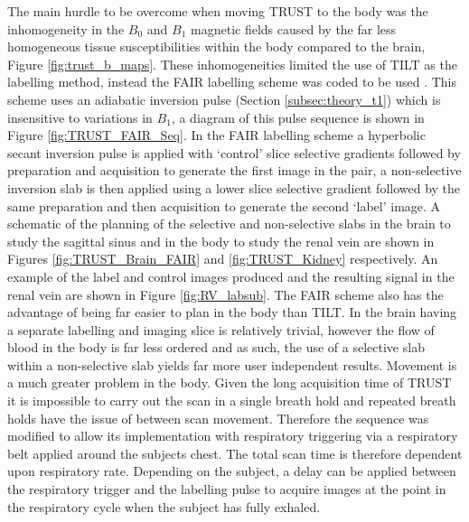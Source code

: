 The main hurdle to be overcome when moving \ac{TRUST} to the body was the inhomogeneity in the $B_0$ and $B_1$ magnetic fields caused by the far less homogeneous tissue susceptibilities within the body compared to the brain, Figure \ref{fig:trust_b_maps}. These inhomogeneities limited the use of \ac{TILT} as the labelling method, instead the \ac{FAIR} labelling scheme was coded to be used \cite{martirosian_fair_2004}. This scheme uses an adiabatic inversion pulse (Section \ref{subsec:theory_t1}) which is insensitive to variations in $B_1$, a diagram of this pulse sequence is shown in Figure \ref{fig:TRUST_FAIR_Seq}. In the \ac{FAIR} labelling scheme a hyperbolic secant inversion pulse is applied with `control' slice selective gradients  followed by \ttwo preparation and acquisition to generate the first image in the pair, a non-selective inversion slab is then applied using a lower slice selective gradient followed by the same \ttwo preparation and then acquisition to generate the second `label' image. A schematic of the planning of the selective and non-selective slabs in the brain to study the sagittal sinus and in the body to study the renal vein are shown in Figures \ref{fig:TRUST_Brain_FAIR} and \ref{fig:TRUST_Kidney} respectively. An example of the label and control images produced and the resulting signal in the renal vein are shown in Figure \ref{fig:RV_labsub}. The \ac{FAIR} scheme also has the advantage of being far easier to plan in the body than \ac{TILT}. In the brain having a separate labelling and imaging slice is relatively trivial, however the flow of blood in the body is far less ordered and as such, the use of a selective slab within a non-selective slab yields far more user independent results. Movement is a much greater problem in the body. Given the long acquisition time of \ac{TRUST} it is impossible to carry out the scan in a single breath hold and repeated breath holds have the issue of between scan movement. Therefore the sequence was modified to allow its implementation with respiratory triggering via a respiratory belt applied around the subjects chest. The total scan time is therefore dependent upon respiratory rate. Depending on the subject, a delay can be applied between the respiratory trigger and the labelling pulse to acquire images at the point in the respiratory cycle when the subject has fully exhaled.

